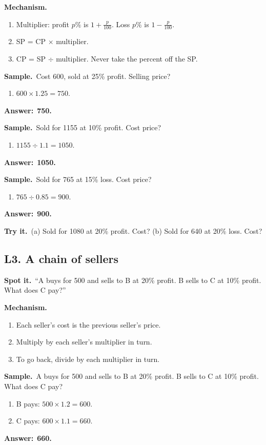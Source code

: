 \documentclass[11pt,a4paper]{article}
\let\oldsubsection\subsection
\renewcommand{\subsection}{\needspace{9\baselineskip}\oldsubsection}
\newcommand{\spot}{\textbf{\color{ember}Spot it.}\ }
\newcommand{\mech}{\textbf{\color{ember}Mechanism.}\ }
\newif\ifkeepsamp
\newcommand{\ans}[1]{\par\nopagebreak\noindent\textbf{\color{ember}Answer:}\ \textbf{#1}\par}
\newcommand{\samp}{\ifkeepsamp\needspace{4\baselineskip}\fi\textbf{\color{ember}Sample.}\ }
\newcommand{\tryit}[1]{\textbf{\color{ember}Try it.}\ #1}
\begin{document}
\mech
\begin{enumerate}
\item Multiplier: profit $p\%$ is $1 + \tfrac{p}{100}$. Loss $p\%$ is $1 - \tfrac{p}{100}$.
\item SP = CP $\times$ multiplier.
\item CP = SP $\div$ multiplier. Never take the percent off the SP.
\end{enumerate}

\samp Cost 600, sold at 25\% profit. Selling price?
\begin{enumerate}
\item $600 \times 1.25 = 750$.
\end{enumerate}
\ans{750.}

\samp Sold for 1155 at 10\% profit. Cost price?
\begin{enumerate}
\item $1155 \div 1.1 = 1050$.
\end{enumerate}
\ans{1050.}

\samp Sold for 765 at 15\% loss. Cost price?
\begin{enumerate}
\item $765 \div 0.85 = 900$.
\end{enumerate}
\ans{900.}

\tryit (a) Sold for 1080 at 20\% profit. Cost? (b) Sold for 640 at 20\% loss. Cost?

\subsection{L3. A chain of sellers}
\spot ``A buys for 500 and sells to B at 20\% profit. B sells to C at 10\% profit. What does C pay?''

\mech
\begin{enumerate}
\item Each seller's cost is the previous seller's price.
\item Multiply by each seller's multiplier in turn.
\item To go back, divide by each multiplier in turn.
\end{enumerate}

\samp A buys for 500 and sells to B at 20\% profit. B sells to C at 10\% profit. What does C pay?
\begin{enumerate}
\item B pays: $500 \times 1.2 = 600$.
\item C pays: $600 \times 1.1 = 660$.
\end{enumerate}
\ans{660.}
\end{document}
